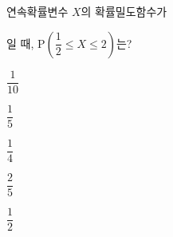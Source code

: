 연속확률변수 $X$의 확률밀도함수가 \par\smallskip{}\par\smallskip\noindent 일 때, $\mathrm{P}\left(\dfrac{1}{2}\le X\le 2\right)$는? 
\begin{choices32}{\rule[-3ex]{0pt}{8ex}$\dfrac{1}{10}$}{\rule[-3ex]{0pt}{8ex}$\dfrac{1}{5}$}{\rule[-3ex]{0pt}{8ex}$\dfrac{1}{4}$}{\rule[-3ex]{0pt}{8ex}$\dfrac{2}{5}$}{\rule[-3ex]{0pt}{8ex}$\dfrac{1}{2}$}\end{choices32}
